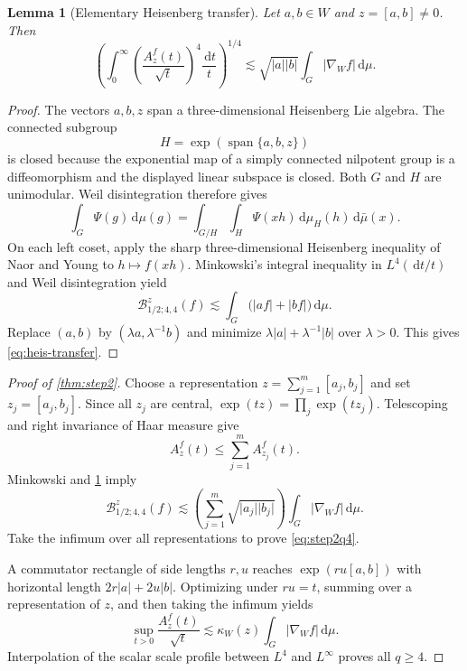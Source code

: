 \documentclass[11pt]{article}
\newtheorem{lemma}[theorem]{Lemma}
\theoremstyle{definition}
\theoremstyle{remark}
\newcommand{\dd}{\,\mathrm d}
\newcommand{\abs}[1]{\lvert #1\rvert}
\newcommand{\A}[2]{A_{#1}^{#2}}
\newcommand{\B}[4]{\mathcal B^{#1}_{#2;#3,#4}}
\newcommand{\less}{\lesssim}
\DeclareMathOperator{\spanop}{span}
\begin{document}
\begin{lemma}[Elementary Heisenberg transfer]\label{lem:heis-transfer}
Let \(a,b\in W\) and \(z=[a,b]\ne0\).  Then
\begin{equation}\label{eq:heis-transfer}
 \left(\int_0^\infty
 \left(\frac{\A{z}{f}(t)}{\sqrt t}\right)^4\frac{\dd t}{t}
 \right)^{1/4}
 \less \sqrt{\abs a\abs b}\int_G\abs{\nabla_Wf}\dd\mu.
\end{equation}
\end{lemma}

\begin{proof}
The vectors \(a,b,z\) span a three-dimensional Heisenberg Lie algebra.  The connected
subgroup
\[
 H=\exp(\spanop\{a,b,z\})
\]
is closed because the exponential map of a simply connected nilpotent group is a
diffeomorphism and the displayed linear subspace is closed.  Both \(G\) and \(H\) are
unimodular.  Weil disintegration therefore gives
\[
 \int_G\Psi(g)\dd\mu(g)=\int_{G/H}\int_H\Psi(xh)\dd\mu_H(h)\dd\bar\mu(x).
\]
On each left coset, apply the sharp three-dimensional Heisenberg inequality of Naor and
Young \cite{NaorYoung2022} to \(h\mapsto f(xh)\).  Minkowski's integral inequality in
\(L^4(\dd t/t)\) and Weil disintegration yield
\[
 \B{z}{1/2}{4}{4}(f)
 \less\int_G\bigl(\abs{af}+\abs{bf}\bigr)\dd\mu.
\]
Replace \((a,b)\) by \((\lambda a,\lambda^{-1}b)\) and minimize
\(\lambda\abs a+\lambda^{-1}\abs b\) over \(\lambda>0\).  This gives
\eqref{eq:heis-transfer}.
\end{proof}

\begin{proof}[Proof of \cref{thm:step2}]
Choose a representation \(z=\sum_{j=1}^m[a_j,b_j]\) and set
\(z_j=[a_j,b_j]\).  Since all \(z_j\) are central,
\(\exp(tz)=\prod_j\exp(tz_j)\).  Telescoping and right invariance of Haar measure give
\[
 \A{z}{f}(t)\le\sum_{j=1}^m\A{z_j}{f}(t).
\]
Minkowski and \cref{lem:heis-transfer} imply
\[
 \B{z}{1/2}{4}{4}(f)
 \less\left(\sum_{j=1}^m\sqrt{\abs{a_j}\abs{b_j}}\right)
 \int_G\abs{\nabla_Wf}\dd\mu.
\]
Take the infimum over all representations to prove \eqref{eq:step2q4}.

A commutator rectangle of side lengths \(r,u\) reaches
\(\exp(ru[a,b])\) with horizontal length \(2r\abs a+2u\abs b\).  Optimizing under
\(ru=t\), summing over a representation of \(z\), and then taking the infimum yields
\[
 \sup_{t>0}\frac{\A{z}{f}(t)}{\sqrt t}
 \less\kappa_W(z)\int_G\abs{\nabla_Wf}\dd\mu.
\]
Interpolation of the scalar scale profile between \(L^4\) and \(L^\infty\) proves all
\(q\ge4\).
\end{proof}
\end{document}
